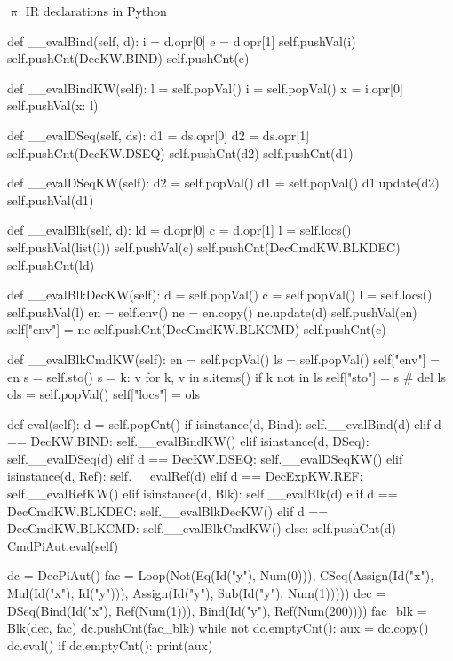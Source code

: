 \documentclass{beamer}
\begin{document}
\begin{frame}{{\color{red}$\uppi$ IR} declarations in Python}
\begin{python}
   def __evalBind(self, d):
       i = d.opr[0]
       e = d.opr[1]
       self.pushVal(i)
       self.pushCnt(DecKW.BIND)
       self.pushCnt(e)

   def __evalBindKW(self):
       l = self.popVal()
       i = self.popVal()
       x = i.opr[0]
       self.pushVal({x: l})

   def __evalDSeq(self, ds):
       d1 = ds.opr[0]
       d2 = ds.opr[1]
       self.pushCnt(DecKW.DSEQ)
       self.pushCnt(d2)
       self.pushCnt(d1)

   def __evalDSeqKW(self):
       d2 = self.popVal()
       d1 = self.popVal()
       d1.update(d2)
       self.pushVal(d1)

   def __evalBlk(self, d):
       ld = d.opr[0]
       c = d.opr[1]
       l = self.locs()
       self.pushVal(list(l))
       self.pushVal(c)
       self.pushCnt(DecCmdKW.BLKDEC)
       self.pushCnt(ld)

   def __evalBlkDecKW(self):
       d = self.popVal()
       c = self.popVal()
       l = self.locs()
       self.pushVal(l)
       en = self.env()
       ne = en.copy()
       ne.update(d)
       self.pushVal(en)
       self["env"] = ne
       self.pushCnt(DecCmdKW.BLKCMD)
       self.pushCnt(c)

   def __evalBlkCmdKW(self):
       en = self.popVal()
       ls = self.popVal()
       self["env"] = en
       s = self.sto()
       s = {k: v for k, v in s.items() if k not in ls}
       self["sto"] = s
       # del ls
       ols = self.popVal()
       self["locs"] = ols

   def eval(self):
       d = self.popCnt()
       if isinstance(d, Bind):
           self.__evalBind(d)
       elif d == DecKW.BIND:
           self.__evalBindKW()
       elif isinstance(d, DSeq):
           self.__evalDSeq(d)
       elif d == DecKW.DSEQ:
           self.__evalDSeqKW()
       elif isinstance(d, Ref):
           self.__evalRef(d)
       elif d == DecExpKW.REF:
           self.__evalRefKW()
       elif isinstance(d, Blk):
           self.__evalBlk(d)
       elif d == DecCmdKW.BLKDEC:
           self.__evalBlkDecKW()
       elif d == DecCmdKW.BLKCMD:
           self.__evalBlkCmdKW()
       else:
           self.pushCnt(d)
           CmdPiAut.eval(self)
\end{python}

\framebreak

\begin{python}
dc = DecPiAut()
fac = Loop(Not(Eq(Id("y"), Num(0))),
          CSeq(Assign(Id("x"), Mul(Id("x"), Id("y"))),
               Assign(Id("y"), Sub(Id("y"), Num(1)))))
dec = DSeq(Bind(Id("x"), Ref(Num(1))),
          Bind(Id("y"), Ref(Num(200))))
fac_blk = Blk(dec, fac)
dc.pushCnt(fac_blk)
while not dc.emptyCnt():
   aux = dc.copy()
   dc.eval()
   if dc.emptyCnt():
       print(aux)
\end{python}

\end{frame}
\end{document}
